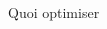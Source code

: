 \begin{frame}{Quoi optimiser}
\begin{columns}
\begin{column}{0.5\textwidth}
\begin{figure}
            \end{figure}
        \end{column}
    \end{columns}
\end{frame}